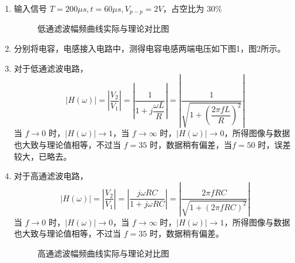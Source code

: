 \documentclass[dvipsnames, svgnames,a4paper,11pt]{article}
\begin{document}
\begin{enumerate}
  \item 输入信号 $T = 200 \mu s, t = 60 \mu s, V_{p-p} = 2V$，占空比为 $30\%$
    \begin{figure}[htbp]
	    \centering

	    \caption{低通滤波幅频曲线实际与理论对比图}
    \end{figure}

  \item 分别将电容，电感接入电路中，测得电容电感两端电压如下图1，图2所示。
  \item 对于低通滤波电路，
    \begin{equation}
      \left |H(\omega) \right | = \left |\dfrac{V_2}{V_1} \right | = \left |\dfrac{1}{1 + j\dfrac{\omega L}{R}}\right | = \left | \dfrac{1}{\sqrt{1 + (\dfrac{2\pi fL}{R})^2}} \right |
    \end{equation}
    当 $f \to 0$ 时，$\left |H(\omega) \right | \to 1$，当 $f \to \infty$ 时，$\left |H(\omega) \right | \to 0$，所得图像与数据也大致与理论值相等，不过当 $f = 35$ 时，数据稍有偏差，当$f = 50$ 时，误差较大，已略去。
  \item 对于高通滤波电路，
    \begin{equation}
      \left |H(\omega) \right | = \left |\dfrac{V_2}{V_1} \right | = \left |\dfrac{j\omega RC}{1 + j\omega RC}\right | = \left | \dfrac{2\pi fRC}{\sqrt{1 + (2\pi fRC)^2}} \right |
    \end{equation}
    当 $f \to 0$ 时，$\left |H(\omega) \right | \to 0$，当 $f \to \infty$ 时，$\left |H(\omega) \right | \to 1$，所得图像与数据也大致与理论值相等，不过当 $f = 35$ 时，数据稍有偏差。

    \begin{figure}[htbp]
	    \centering

	    \caption{高通滤波幅频曲线实际与理论对比图}
    \end{figure}
\end{enumerate}
\end{document}
